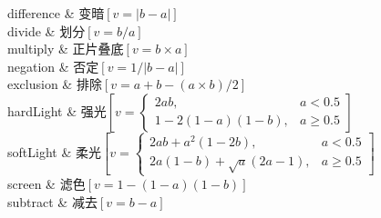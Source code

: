 difference
    &
变暗$\left[v=\left|b-a\right|\right]$
    \\

divide
    &
划分$\left[v=b/a\right]$
    \\

multiply
    &
正片叠底$\left[v=b\times{}a\right]$
    \\

negation
    &
否定$\left[v=1/\left|b-a\right|\right]$
    \\

exclusion
    &
排除$\left[v=a+b-(a\times{}b)/2\right]$
    \\

hardLight
    &
强光$\left[v=\begin{cases}
2ab, & a<0.5 \\
1-2(1-a)(1-b), & a\ge{}0.5
\end{cases}\right]$
    \\

softLight
    &
柔光$\left[v=\begin{cases}
2ab+a^2(1-2b), & a<0.5 \\
2a(1-b)+\sqrt{a}(2a-1), & a\ge{}0.5
\end{cases}\right]$
    \\

screen
    &
滤色$\left[v=1-(1-a)(1-b)\right]$
    \\

subtract
    &
减去$\left[v=b-a\right]$
    \\












